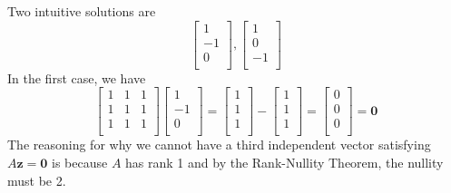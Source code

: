 \documentclass[a4paper]{article}
\begin{document}
Two intuitive solutions are
\[
	\begin{bmatrix}
		1 \\
		-1 \\
		0 \\
	\end{bmatrix}
,
	\begin{bmatrix}
		1 \\
		0 \\
		-1 \\
	\end{bmatrix}
\]
In the first case, we have
\[
	\begin{bmatrix}
		1 & 1 & 1 \\
		1 & 1 & 1 \\
		1 & 1 & 1 \\
	\end{bmatrix}
	\begin{bmatrix}
		1 \\
		-1 \\
		0 \\
	\end{bmatrix}
	= 
	\begin{bmatrix}
		1 \\
		1 \\
		1 \\
	\end{bmatrix}
	-
	\begin{bmatrix}
		1 \\
		1 \\
		1 \\
	\end{bmatrix}
	=
	\begin{bmatrix}
		0 \\
		0 \\
		0 \\
	\end{bmatrix}
	=
	\bm{0}
\]
The reasoning for why we cannot have a third independent vector satisfying \(A \bm{z} = \bm{0}\) is because \(A\) has rank 1 and by the Rank-Nullity Theorem, the nullity must be 2.

\vspace{12pt}

\end{document}
